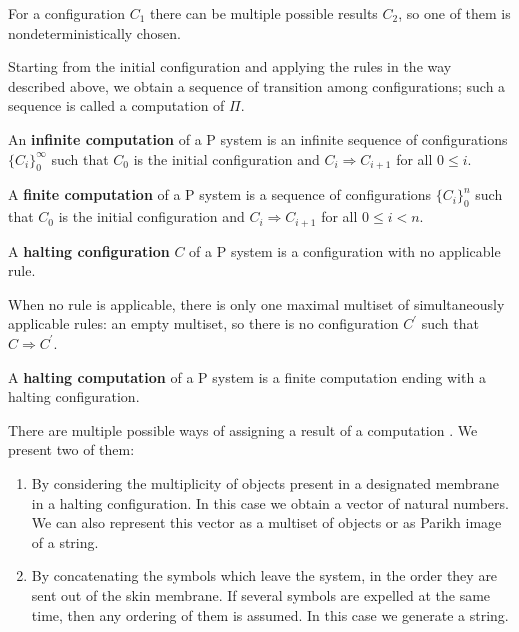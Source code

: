 For a configuration $C_1$ there can be multiple possible results $C_2$, so one of them is nondeterministically chosen.

Starting from the initial configuration and applying the rules in the way described above, we obtain a sequence of transition among configurations; such a sequence is called a computation of $\Pi$.

\begin{definition}
  An {\bf infinite computation} of a P system is an infinite sequence of configurations $\{C_i\}_0^\infty$ such that $C_0$ is the initial configuration and $C_i\Rightarrow C_{i+1}$ for all $0\leq i$.
\end{definition}

\begin{definition}
  A {\bf finite computation} of a P system is a sequence of configurations $\{C_i\}_0^n$ such that $C_0$ is the initial configuration and $C_i\Rightarrow C_{i+1}$ for all $0\leq i<n$.
\end{definition}

\begin{definition}
  A {\bf halting configuration} $C$ of a P system is a configuration with no applicable rule.
\end{definition}

When no rule is applicable, there is only one maximal multiset of simultaneously applicable rules: an empty multiset, so there is no configuration $C^\prime$ such that $C\Rightarrow C^\prime$.

\begin{definition}
  A {\bf halting computation} of a P system is a finite computation ending with a halting configuration.
\end{definition}


There are multiple possible ways of assigning a result of a computation \cite{Besozzi:PhD:2004}. We present two of them:

\begin{enumerate}
    \item By considering the multiplicity of objects present in a designated membrane in a halting configuration. In this case we obtain a vector of natural numbers. We can also represent this vector as a multiset of objects or as Parikh image of a string.
    \item By concatenating the symbols which leave the system, in the order they are sent out of the skin membrane. If several symbols are expelled at the same time, then any ordering of them is assumed. In this case we generate a string.
\end{enumerate}

